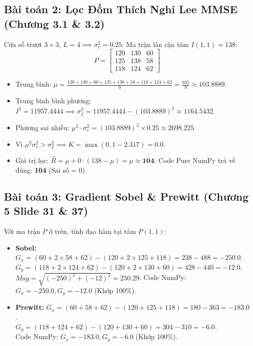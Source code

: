 \documentclass[11pt,a4paper]{article}
\begin{document}
\subsection{Bài toán 2: Lọc Đốm Thích Nghi Lee MMSE (Chương 3.1 \& 3.2)}
Cửa sổ trượt $3 \times 3$, $L = 4 \implies \sigma_v^2 = 0.25$. Ma trận lân cận tâm $I(1, 1) = 138$:
\begin{equation}
P = \begin{bmatrix} 120 & 130 & 60 \\ 125 & 138 & 58 \\ 118 & 124 & 62 \end{bmatrix}
\end{equation}
\begin{itemize}
    \item Trung bình: $\mu = \frac{120+130+60+125+138+58+118+124+62}{9} = \frac{935}{9} \approx 103.8889$.
    \item Trung bình bình phương: $\overline{I^2} = 11957.4444 \implies \sigma_I^2 = 11957.4444 - (103.8889)^2 \approx 1164.5432$.
    \item Phương sai nhiễu: $\mu^2 \cdot \sigma_v^2 = (103.8889)^2 \times 0.25 \approx 2698.225$.
    \item Vì $\mu^2 \sigma_v^2 > \sigma_I^2 \implies K = \max(0, 1 - 2.317) = \mathbf{0.0}$.
    \item Giá trị lọc: $\hat{R} = \mu + 0 \cdot (138 - \mu) = \mu \approx \mathbf{104}$. Code Pure NumPy trả về đúng: \textbf{104} (Sai số = 0).
\end{itemize}

\subsection{Bài toán 3: Gradient Sobel \& Prewitt (Chương 5 Slide 31 \& 37)}
Với ma trận $P$ ở trên, tính đạo hàm tại tâm $P(1, 1)$:
\begin{itemize}
    \item \textbf{Sobel:} $G_x = (60 + 2 \times 58 + 62) - (120 + 2 \times 125 + 118) = 238 - 488 = \mathbf{-250.0}$.\\
    $G_y = (118 + 2 \times 124 + 62) - (120 + 2 \times 130 + 60) = 428 - 440 = \mathbf{-12.0}$.\\
    $Mag = \sqrt{(-250)^2 + (-12)^2} = \mathbf{250.29}$. Code NumPy: $G_x = -250.0, G_y = -12.0$ (Khớp 100\%).
    \item \textbf{Prewitt:} $G_x = (60 + 58 + 62) - (120 + 125 + 118) = 180 - 363 = \mathbf{-183.0}$.\\
    $G_y = (118 + 124 + 62) - (120 + 130 + 60) = 304 - 310 = \mathbf{-6.0}$.\\
    Code NumPy: $G_x = -183.0, G_y = -6.0$ (Khớp 100\%).
\end{itemize}
\end{document}
